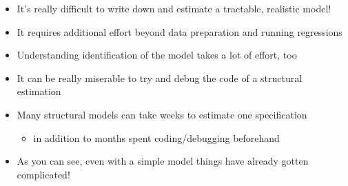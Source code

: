 \documentclass[11pt]{article}
\begin{document}
\begin{itemize}
\item It's really difficult to write down and estimate a tractable, realistic model!
\item It requires additional effort beyond data preparation and running regressions
\item Understanding identification of the model takes a lot of effort, too
\item It can be really miserable to try and debug the code of a structural estimation
\item Many structural models can take weeks to estimate one specification
\begin{itemize}
\item in addition to months spent coding/debugging beforehand
\end{itemize}
\item As you can see, even with a simple model things have already gotten complicated!
\end{itemize}
\end{document}

